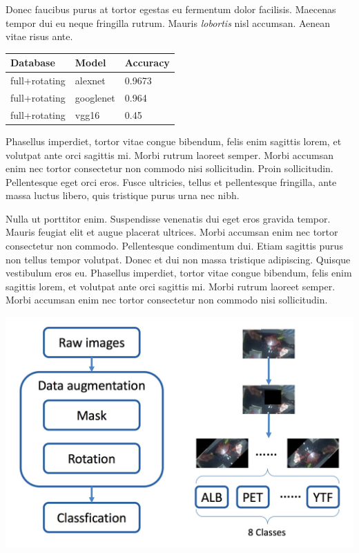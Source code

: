 \documentclass[a0,portrait]{a0poster}
\begin{document}
\begin{multicols}{2}
Donec faucibus purus at tortor egestas eu fermentum dolor facilisis. Maecenas tempor dui eu neque fringilla rutrum. Mauris \emph{lobortis} nisl accumsan. Aenean vitae risus ante.
%
\begin{table} %
\begin{tabular}{l l l}
\toprule
\textbf{Database} & \textbf{Model} & \textbf{Accuracy}\\
\midrule
       full+rotating & alexnet     & 0.9673  \\
       full+rotating & googlenet   &0.964    \\
       full+rotating  & vgg16  & 0.45  \\
\bottomrule
\end{tabular}
\end{table}
%
Phasellus imperdiet, tortor vitae congue bibendum, felis enim sagittis lorem, et volutpat ante orci sagittis mi. Morbi rutrum laoreet semper. Morbi accumsan enim nec tortor consectetur non commodo nisi sollicitudin. Proin sollicitudin. Pellentesque eget orci eros. Fusce ultricies, tellus et pellentesque fringilla, ante massa luctus libero, quis tristique purus urna nec nibh.

Nulla ut porttitor enim. Suspendisse venenatis dui eget eros gravida tempor. Mauris feugiat elit et augue placerat ultrices. Morbi accumsan enim nec tortor consectetur non commodo. Pellentesque condimentum dui. Etiam sagittis purus non tellus tempor volutpat. Donec et dui non massa tristique adipiscing. Quisque vestibulum eros eu. Phasellus imperdiet, tortor vitae congue bibendum, felis enim sagittis lorem, et volutpat ante orci sagittis mi. Morbi rutrum laoreet semper. Morbi accumsan enim nec tortor consectetur non commodo nisi sollicitudin.

\begin{center}\vspace{1cm}
\includegraphics[width=0.8\linewidth]{process}
\end{center}\vspace{1cm}


\end{multicols}
\end{document}
